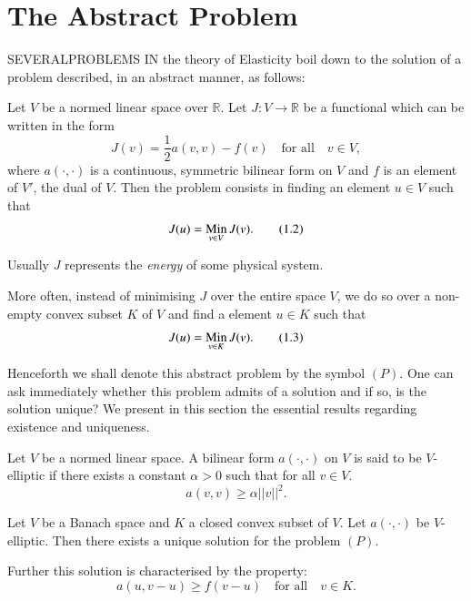 
\chapter{The Abstract Problem}\label{chap1}

SEVERAL\pageoriginale PROBLEMS IN the theory of Elasticity boil down
to the solution of a problem described, in an abstract manner, as
follows:

Let $V$ be a normed linear space over $\mathbb{R}$. Let $J:V\to
\mathbb{R}$ be a functional which can be written in the form
\begin{equation*}
J(v)=\frac{1}{2}a(v,v)-f(v)\quad \text{for all}\quad v\in
V,\tag{1.1}\label{chap1-eq1.1} 
\end{equation*}
where $a(\cdot,\cdot)$ is a continuous, symmetric bilinear form on $V$
and $f$ is an element of $V'$, the dual of $V$. Then the problem
consists in finding an element $u\in V$ such that
\begin{equation*}
J(u)=\operatorname*{Min}_{v\in
    V}J(v).\tag{1.2}\label{chap1-eq1.2} 
\end{equation*}

Usually $J$ represents the {\em energy} of some physical system. 

More often, instead of minimising $J$ over the entire space $V$, we do
so over a non-empty convex subset $K$ of $V$ and find a element $u\in
K$ such that
\begin{equation*}
J(u)=\operatorname*{Min}_{v\in K}J(v).\tag{1.3}\label{chap1-eq1.3}
\end{equation*}

Henceforth we shall denote this abstract problem by the symbol
$(P)$. One can ask immediately whether this problem admits of a
solution and if so, is the solution unique? We present in this section
the essential results regarding existence and uniqueness.

\begin{definition}\label{chap1-def1.1}
Let $V$ be a normed linear space. A bilinear form $a(\cdot,\cdot)$ on
$V$ is said to be $V$-elliptic if there exists a constant $\alpha>0$
such that for all $v\in V$.
\begin{equation*}
a(v,v)\geq \alpha || v ||^{2}.\tag{1.4}\label{chap1-eq1.4}
\end{equation*}\pageoriginale
\end{definition}

\begin{theorem}\label{chap1-thm1.1}
Let $V$ be a Banach space and $K$ a closed convex subset of $V$. Let
$a(\cdot,\cdot)$ be $V$-elliptic. Then there exists a unique solution
for the problem $(P)$.

Further this solution is characterised by the property:
\begin{equation*}
a(u,v-u)\geq f(v-u)\quad\text{for all}\quad v\in
K.\tag{1.5}\label{chap1-eq1.5} 
\end{equation*}
\end{theorem}

